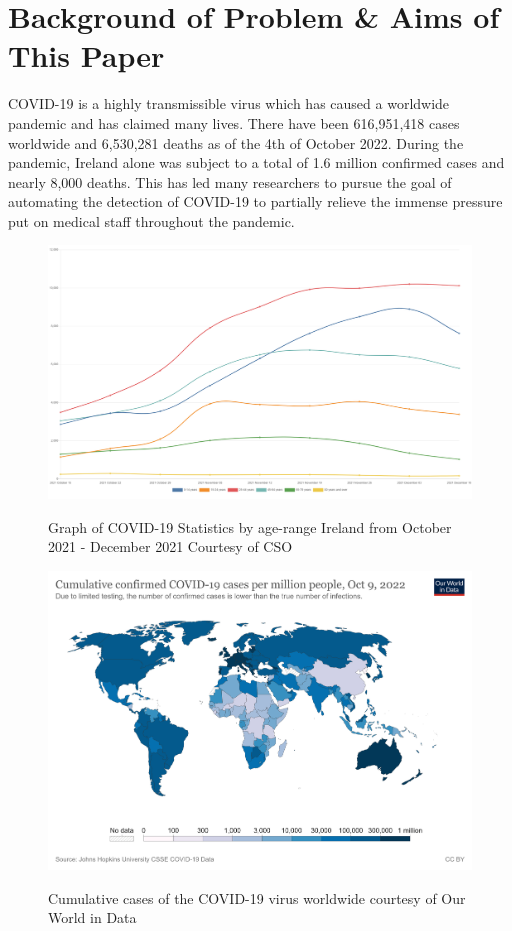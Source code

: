 \section{Background of Problem \& Aims of This Paper}
COVID-19 is a highly transmissible virus which has caused a worldwide pandemic and has claimed many lives. There have been 616,951,418 cases worldwide and 6,530,281 deaths as of the 4th of October 2022\cite{covid19StatsWorldwide}.  During the pandemic, Ireland alone was subject to a total of 1.6 million confirmed cases and nearly 8,000 deaths\cite{covid19StatsIreland}.  This has led many researchers to pursue the goal of automating the detection of COVID-19 to partially relieve the immense pressure put on medical staff throughout the pandemic. 
\vspace{0.5mm}
\begin{figure}[H]
    \centering
    \includegraphics[width=1\textwidth,keepaspectratio]{Images/COVID19IrelandFigures.png}\\
    \caption{Graph of COVID-19 Statistics by age-range Ireland from October 2021 - December 2021 Courtesy of CSO\cite{csoCovid19Stats}}
    \label{fig:COVID-19 Ireland Statistics}
\end{figure}
\begin{figure}[H]
    \centering
    \includegraphics[width=1\textwidth,keepaspectratio]{Images/coronavirusWorldWide.png}\\
    \caption{Cumulative cases of the COVID-19 virus worldwide courtesy of Our World in Data\cite{cumulativeCovid19Cases}}
    \label{fig:COVID-19 Worldwide Statistics}
\end{figure}

